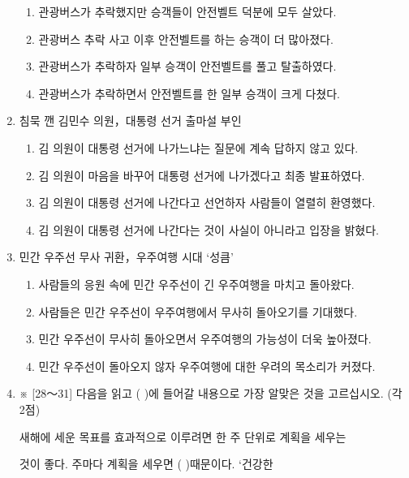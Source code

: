 \documentclass[12pt]{article}
\begin{document}
\begin{enumerate}[1.]
    \begin{enumerate}[1)]
        \item 관광버스가 추락했지만 승객들이 안전벨트 덕분에 모두 살았다.
        \item 관광버스 추락 사고 이후 안전벨트를 하는 승객이 더 많아졌다.
        \item 관광버스가 추락하자 일부 승객이 안전벨트를 풀고 탈출하였다.
        \item 관광버스가 추락하면서 안전벨트를 한 일부 승객이 크게 다쳤다.
    \end{enumerate}


    \item 침묵 깬 김민수 의원，대통령 선거 출마설 부인

    \begin{enumerate}[1)]
        \item 김 의원이 대통령 선거에 나가느냐는 질문에 계속 답하지 않고 있다.
        \item 김 의원이 마음을 바꾸어 대통령 선거에 나가겠다고 최종 발표하였다.
        \item 김 의원이 대통령 선거에 나간다고 선언하자 사람들이 열렬히 환영했다.
        \item 김 의원이 대통령 선거에 나간다는 것이 사실이 아니라고 입장을 밝혔다.
    \end{enumerate}



    \item 민간 우주선 무사 귀환，우주여행 시대 ‘성큼’

    \begin{enumerate}[1)]
        \item 사람들의 응원 속에 민간 우주선이 긴 우주여행을 마치고 돌아왔다.
        \item 사람들은 민간 우주선이 우주여행에서 무사히 돌아오기를 기대했다.
        \item 민간 우주선이 무사히 돌아오면서 우주여행의 가능성이 더욱 높아졌다.
        \item 민간 우주선이 돌아오지 않자 우주여행에 대한 우려의 목소리가 커졌다.
    \end{enumerate}


    \item ※ [28～31] 다음을 읽고 (   )에 들어갈 내용으로 가장 알맞은 것을 고르십시오. (각 2점)


    \begin{mdframed}
    새해에 세운 목표를 효과적으로 이루려면 한 주 단위로 계획을 세우는

    것이 좋다. 주마다 계획을 세우면 (     )때문이다. ‘건강한


\end{mdframed}
\end{enumerate}
\end{document}
